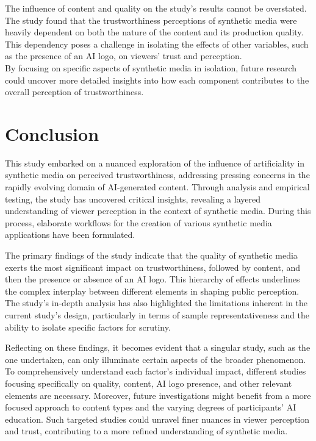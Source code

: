 \documentclass[
  a4paper,  %
  twoside,  %
  bibliography=totoc,
  headsepline,
  cleardoublepage=empty,
  parskip=half,
  draft=false
]{scrbook}
\begin{document}
The influence of content and quality on the study's results cannot be overstated. The study found that the trustworthiness perceptions of synthetic media were heavily dependent on both the nature of the content and its production quality. This dependency poses a challenge in isolating the effects of other variables, such as the presence of an AI logo, on viewers' trust and perception. \\
By focusing on specific aspects of synthetic media in isolation, future research could uncover more detailed insights into how each component contributes to the overall perception of trustworthiness.

\chapter{Conclusion}
\label{chap:conclusion}

This study embarked on a nuanced exploration of the influence of artificiality in synthetic media on perceived trustworthiness, addressing pressing concerns in the rapidly evolving domain of AI-generated content. Through analysis and empirical testing, the study has uncovered critical insights, revealing a layered understanding of viewer perception in the context of synthetic media. During this process, elaborate workflows for the creation of various synthetic media applications have been formulated.

The primary findings of the study indicate that the quality of synthetic media exerts the most significant impact on trustworthiness, followed by content, and then the presence or absence of an AI logo. This hierarchy of effects underlines the complex interplay between different elements in shaping public perception. The study's in-depth analysis has also highlighted the limitations inherent in the current study's design, particularly in terms of sample representativeness and the ability to isolate specific factors for scrutiny.

Reflecting on these findings, it becomes evident that a singular study, such as the one undertaken, can only illuminate certain aspects of the broader phenomenon. To comprehensively understand each factor's individual impact, different studies focusing specifically on quality, content, AI logo presence, and other relevant elements are necessary. Moreover, future investigations might benefit from a more focused approach to content types and the varying degrees of participants' AI education. Such targeted studies could unravel finer nuances in viewer perception and trust, contributing to a more refined understanding of synthetic media.
\end{document}
